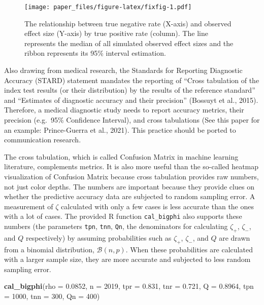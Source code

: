 \documentclass[english,man,floatsintext]{apa6}
\newenvironment{Shaded}{\begin{snugshade}}{\end{snugshade}}
\newcommand{\DataTypeTok}[1]{\textcolor[rgb]{0.13,0.29,0.53}{#1}}
\newcommand{\DecValTok}[1]{\textcolor[rgb]{0.00,0.00,0.81}{#1}}
\newcommand{\FloatTok}[1]{\textcolor[rgb]{0.00,0.00,0.81}{#1}}
\newcommand{\KeywordTok}[1]{\textcolor[rgb]{0.13,0.29,0.53}{\textbf{#1}}}
\newcommand{\NormalTok}[1]{#1}
\begin{document}
\begin{figure}
\centering
\texttt{[image: paper\_files/figure-latex/fixfig-1.pdf]}
\caption{\label{fig:fixfig}The relationship between true negative rate (X-axis) and observed effect size (Y-axis) by true positive rate (column). The line represents the median of all simulated observed effect sizes and the ribbon represents its 95\% interval estimation.}
\end{figure}

Also drawing from medical research, the Standards for Reporting Diagnostic Accuracy (STARD) statement mandates the reporting of \enquote{Cross tabulation of the index test results (or their distribution) by the results of the reference standard} and \enquote{Estimates of diagnostic accuracy and their precision} (Bossuyt et al., 2015). Therefore, a medical diagnostic study needs to report accuracy metrics, their precision (e.g.~95\% Confidence Interval), and cross tabulations (See this paper for an example: Prince-Guerra et al., 2021). This practice should be ported to communication research.

The cross tabulation, which is called Confusion Matrix in machine learning literature, complements metrics. It is also more useful than the so-called heatmap visualization of Confusion Matrix because cross tabulation provides raw numbers, not just color depths. The numbers are important because they provide clues on whether the predictive accuracy data are subjected to random sampling error. A measurement of \(\zeta\) calculated with only a few cases is less accurate than the ones with a lot of cases. The provided R function \texttt{cal\_bigphi} also supports these numbers (the parameters \texttt{tpn}, \texttt{tnn}, \texttt{Qn}, the denominators for calculating \(\zeta_{+}\), \(\zeta_{-}\), and \(Q\) respectively) by assuming probabilities such as \(\zeta_{+}\), \(\zeta_{-}\), and \(Q\) are drawn from a binomial distribution, \(\mathcal{B}(n, p)\). When these probabilities are calculated with a larger sample size, they are more accurate and subjected to less random sampling error.

\begin{Shaded}
\begin{Highlighting}[]
\KeywordTok{cal_bigphi}\NormalTok{(}\DataTypeTok{rho =} \FloatTok{0.0852}\NormalTok{, }\DataTypeTok{n =} \DecValTok{2019}\NormalTok{,}
           \DataTypeTok{tpr =} \FloatTok{0.831}\NormalTok{, }\DataTypeTok{tnr =} \FloatTok{0.721}\NormalTok{,}
           \DataTypeTok{Q =} \FloatTok{0.8964}\NormalTok{, }\DataTypeTok{tpn =} \DecValTok{1000}\NormalTok{,}
           \DataTypeTok{tnn =} \DecValTok{300}\NormalTok{, }\DataTypeTok{Qn =} \DecValTok{400}\NormalTok{)}
\end{Highlighting}
\end{Shaded}
\end{document}

